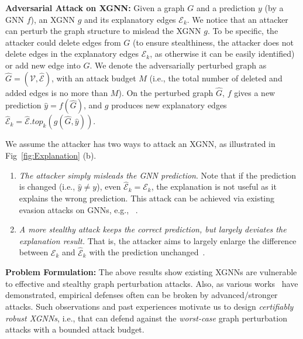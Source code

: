 {\bf Adversarial Attack on XGNN:} Given a graph $G$ and a prediction $y$ (by a GNN $f$), an XGNN $g$ and its explanatory edges $\mathcal{E}_k$. We notice that an attacker can perturb the graph structure to mislead the XGNN $g$. To be specific, the attacker could delete edges from $G$ (to ensure stealthiness, the attacker does not delete edges in the explanatory edges   $\mathcal{E}_k$, as otherwise it can be easily identified) or add new edge into $G$. We denote the adversarially perturbed graph as $\hat{G} = (\mathcal{V}, \hat{\mathcal{E}})$, with an attack budget $M$ (i.e., the total number of deleted and added edges is no more than $M$). On the perturbed graph $\hat{G}$, $f$ gives a new prediction $\hat{y}=f(\hat{G})$, and $g$ produces new explanatory edges $\hat{\mathcal{E}}_k = \hat{\mathcal{E}}.top_k(g(\hat{G},\hat{y}))$.

We assume the attacker has two ways to attack an XGNN, as illustrated in Fig~\ref{fig:Explanation} (b). 
\begin{enumerate}[leftmargin=*]
\vspace{-2mm}
\item \emph{The attacker simply misleads the GNN prediction}. Note that if the prediction is changed (i.e., $\hat{y} \neq y$), even $\hat{\mathcal{E}}_k = \mathcal{E}_k$, the explanation is not useful as it explains the wrong prediction. This attack can be achieved via existing evasion attacks on GNNs, e.g., ~\cite{dai2018adversarial,zugner2018adversarial,xu2019topology,mu2021hard,wang2022bandits}.  


\item \emph{A more stealthy attack keeps the correct prediction, but largely deviates the explanation result.}  That is, the attacker aims to largely enlarge the difference 
between 
$\mathcal{E}_k$ and $\hat{\mathcal{E}}_k$ with  the prediction unchanged~\citep{li2024graph}. 

\end{enumerate}


{\bf Problem Formulation:} 
The above results show existing XGNNs are vulnerable to effective and stealthy graph perturbation attacks. Also, 
as various works~\citep{carlini2019evaluating,mujkanovic2022defenses} have demonstrated, empirical defenses often can be  broken by advanced/stronger attacks. Such observations and past experiences motivate us 
to design \emph{certifiably robust XGNNs}, i.e., that can defend against the \emph{worst-case} graph perturbation attacks with a bounded attack budget. 

